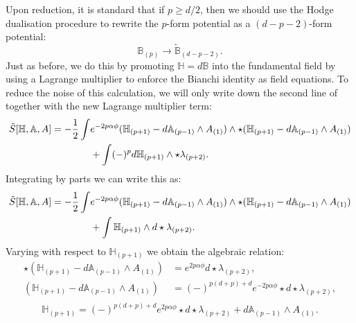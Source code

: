 Upon reduction, it is standard that if $p \geq d/2$, then we should use the Hodge dualisation procedure to rewrite the $p$-form potential as a $(d-p-2)$-form potential:
\begin{equation*}
	\mathbb{B}_{(p)} \rightarrow \tilde{\mathbb{B}}_{(d-p-2)} .
\end{equation*}
Just as before, we do this by promoting $\mathbb{H} = d\mathbb{B}$ into the fundamental field by using a Lagrange multiplier to enforce the Bianchi identity as field equations. To reduce the noise of this calculation, we will only write down the second line of  together with the new Lagrange multiplier term:
\begin{equation*}
\begin{aligned}
		\tilde{S}[\mathbb{H},\mathbb{A},A] = - \frac{1}{2} \int &e^{-2p\alpha \phi}  (\mathbb{H}_{(p+1)} - d \mathbb{A}_{(p-1)} \wedge A_{(1)})\wedge \star (\mathbb{H}_{(p+1)} - d \mathbb{A}_{(p-1)} \wedge A_{(1)}) \\
		&+ \int (-)^p d\mathbb{H}_{(p+1)} \wedge \star \lambda_{(p+2)}.
\end{aligned}
\end{equation*}
Integrating by parts we can write this as:
\begin{equation*}
\begin{aligned}
		\tilde{S}[\mathbb{H},\mathbb{A},A] = - \frac{1}{2} \int &e^{-2p\alpha \phi}  (\mathbb{H}_{(p+1)} - d \mathbb{A}_{(p-1)} \wedge A_{(1)}) \wedge \star(\mathbb{H}_{(p+1)} - d \mathbb{A}_{(p-1)} \wedge A_{(1)}) \\
		&+ \int \mathbb{H}_{(p+1)} \wedge d \star \lambda_{(p+2)}.
\end{aligned}
\end{equation*}
Varying with respect to $\mathbb{H}_{(p+1)}$ we obtain the algebraic relation:
\begin{equation*}
\begin{aligned}
		\star (\mathbb{H}_{(p+1)} - d \mathbb{A}_{(p-1)} \wedge A_{(1)}) &=  e^{2p\alpha \phi} d \star \lambda_{(p+2)}, \\
		(\mathbb{H}_{(p+1)} - d \mathbb{A}_{(p-1)} \wedge A_{(1)}) &=  (-)^{p(d + p) + d} e^{-2p\alpha \phi} \star d \star \lambda_{(p+2)} ,\\
\end{aligned}
\end{equation*}
\begin{equation*}
	\mathbb{H}_{(p+1)} = (-)^{p(d + p)+d} e^{2p\alpha \phi} \star d \star \lambda_{(p+2)}+ d \mathbb{A}_{(p-1)} \wedge A_{(1)}.
\end{equation*}
